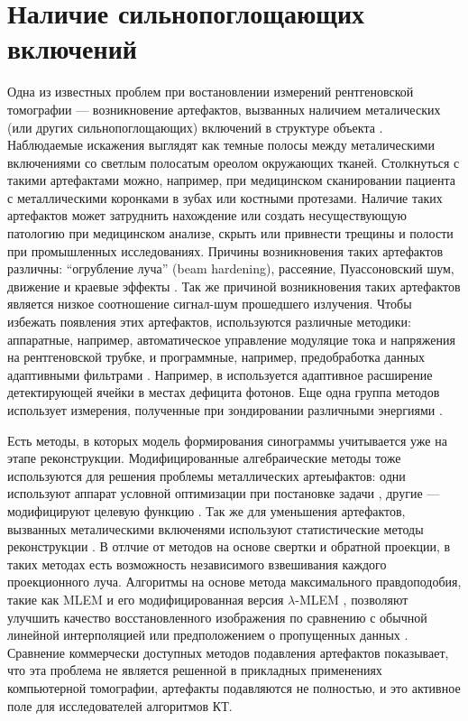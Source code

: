\section{Наличие сильнопоглощающих включений}

Одна из известных проблем при востановлении измерений рентгеновской томографии --- возникновение артефактов, вызванных наличием металических (или других сильнопоглощающих) включений в структуре объекта \cite{barrett2004artifacts, boas2012ct, nasirudin2015reduction, park2015computed}.
Наблюдаемые искажения выглядят как темные полосы между металическими включениями со светлым полосатым ореолом окружающих тканей.
Столкнуться с такими артефактами можно, например, при медицинском сканировании пациента с металлическими коронками в зубах или костными протезами.
Наличие таких артефактов может затруднить нахождение или создать несуществующую патологию при медицинском анализе, скрыть или привнести трещины и полости при промышленных исследованиях.
Причины возникновения таких артефактов различны: ``огрубление луча'' (beam hardening), рассеяние, Пуассоновский шум, движение и краевые эффекты \cite{boas2012ct}.
Так же причиной возникновения таких артефактов является низкое соотношение сигнал-шум прошедшего излучения.
Чтобы избежать появления этих артефактов, используются различные методики: аппаратные, например, автоматическое управление модуляцие тока и напряжения на рентгеновской трубке, и программные, например, предобработка данных адаптивными фильтрами \cite{zhang2007reducing}.
Например, в \cite{boas2012ct} используется адаптивное расширение детектирующей ячейки в местах дефицита фотонов.
Еще одна группа методов использует измерения, полученные при зондировании различными энергиями \cite{bamberg2011metal, kuchenbecker2015dual}.

Есть методы, в которых модель формирования синограммы учитывается уже на этапе реконструкции.
Модифицированные алгебраические методы тоже используются для решения проблемы металлических артеыфактов: одни используют аппарат условной оптимизации при постановке задачи \cite{zhang2011metal, sidky2008image}, другие --- модифицируют целевую функцию \cite{meyer2010normalized, kotsenas2015ct}.
Так же для уменьшения артефактов, вызванных металическими включенями используют статистические методы реконструкции \cite{jmuller2006, buzug2008computed}.
В отлчие от методов на основе свертки и обратной проекции, в таких методах есть возможность независимого взвешивания каждого проекционного луча.
Алгоритмы на основе метода максимального правдоподобия, такие как MLEM \cite{buzug2008computed, wang1996iterative} и его модифицированная версия $\lambda$-MLEM \cite{oehler2007statistical}, позволяют улучшить качество восстановленного изображения по сравнению с обычной линейной интерполяцией или предположением о пропущенных данных \cite{amirkhanov2012evaluation}.
Сравнение коммерчески доступных методов подавления артефактов \cite{huang2015evaluation} показывает, что эта проблема не является решенной в прикладных применениях компьютерной томографии, артефакты подавляются не полностью, и это активное поле для исследователей алгоритмов КТ.

